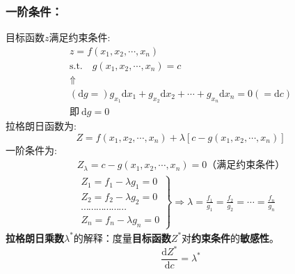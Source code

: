 \documentclass[12pt, a4paper, oneside]{article}
\begin{document}
\begin{CJK*}{UTF8}{gbsn}
\subsubsection{一阶条件：}
\noindent
目标函数$z$满足约束条件:
$$
\begin{array}{c}
	z=f\left(x_{1}, x_{2}, \cdots, x_{n}\right)
	\\
	\text{s.t.} \quad 
	g\left(x_{1}, x_{2}, \cdots, x_{n}\right)=c
	\\
	\Uparrow
	\\
	(\mathrm{d}g=)
	g_{x_1}\mathrm{d}x_1+g_{x_2}\mathrm{d}x_2+\cdots+g_{x_n}\mathrm{d}x_n=0
	(=\mathrm{d}c)
	\\
	\text{即}\ \mathrm{d}g=0
\end{array}
$$
拉格朗日函数为:
$$
Z=f\left(x_{1}, x_{2}, \cdots, x_{n}\right)+\lambda\left[c-g\left(x_{1}, x_{2}, \cdots, x_{n}\right)\right]
$$
一阶条件为:
$$
\begin{array}{l}
	Z_{\lambda}=c-g\left(x_{1}, x_{2}, \cdots, x_{n}\right)=0 \text{（满足约束条件）} \\
	\left.\begin{array}{l}
		Z_{1}=f_{1}-\lambda g_{1}=0 \\
		Z_{2}=f_{2}-\lambda g_{2}=0 \\
		\cdots \cdots \cdots \cdots \cdots \cdots \\
		Z_{n}=f_{n}-\lambda g_{n}=0
	\end{array}\right\}
	\Rightarrow
	\lambda = 
	\frac{f_{1}}{g_{1}} = \frac{f_{2}}{g_{2}} = \cdots = \frac{f_{n}}{g_{n}} 
\end{array}
$$
\textbf{拉格朗日乘数}$\lambda^{*}$的解释：度量\textbf{目标函数}$Z^{*}$对\textbf{约束条件}的\textbf{敏感性}。
$$
\frac{\mathrm{d} Z^{*}}{\mathrm{d} c} = \lambda^{*}
$$

\end{CJK*}
\end{document}
